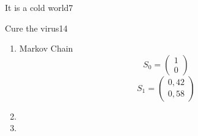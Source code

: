 \begin{questions}
\begin{question}{It is a cold world}{7}
\begin{answer}
\begin{enumerate}
		\end{enumerate}
		
	\end{answer}
		
	\end{question}

	
\begin{question}{Cure the virus}{14}		
	\begin{answer} 
	\begin{enumerate}
		\item Markov Chain
				\begin{equation}
				S_{0} = 
\begin{pmatrix}
1 \\
0

\end{pmatrix}
		\end{equation}
						\begin{equation}
				S_{1} = 
\begin{pmatrix}
0,42 \\
0,58

\end{pmatrix}
		\end{equation}
		\begin{equation}
		\end{equation}
		\begin{equation}
		\end{equation}
			\begin{equation}
		\end{equation}
		
		\item 
		\item 
		
		\end{enumerate}
		
	\end{answer}
		
	\end{question}

	
\end{questions}

